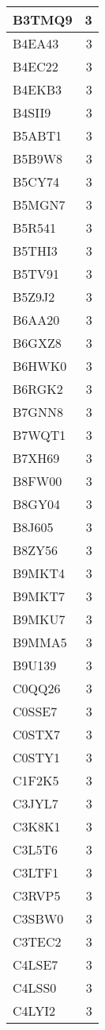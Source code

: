 \documentclass[
]{book}
\theoremstyle{definition}
\theoremstyle{definition}
\theoremstyle{definition}
\theoremstyle{definition}
\theoremstyle{remark}
\begin{document}
\begin{table}
\begin{tabular}{l|r}
\hline
B3TMQ9 & 3\\
\hline
B4EA43 & 3\\
\hline
B4EC22 & 3\\
\hline
B4EKB3 & 3\\
\hline
B4SII9 & 3\\
\hline
B5ABT1 & 3\\
\hline
B5B9W8 & 3\\
\hline
B5CY74 & 3\\
\hline
B5MGN7 & 3\\
\hline
B5R541 & 3\\
\hline
B5THI3 & 3\\
\hline
B5TV91 & 3\\
\hline
B5Z9J2 & 3\\
\hline
B6AA20 & 3\\
\hline
B6GXZ8 & 3\\
\hline
B6HWK0 & 3\\
\hline
B6RGK2 & 3\\
\hline
B7GNN8 & 3\\
\hline
B7WQT1 & 3\\
\hline
B7XH69 & 3\\
\hline
B8FW00 & 3\\
\hline
B8GY04 & 3\\
\hline
B8J605 & 3\\
\hline
B8ZY56 & 3\\
\hline
B9MKT4 & 3\\
\hline
B9MKT7 & 3\\
\hline
B9MKU7 & 3\\
\hline
B9MMA5 & 3\\
\hline
B9U139 & 3\\
\hline
C0QQ26 & 3\\
\hline
C0SSE7 & 3\\
\hline
C0STX7 & 3\\
\hline
C0STY1 & 3\\
\hline
C1F2K5 & 3\\
\hline
C3JYL7 & 3\\
\hline
C3K8K1 & 3\\
\hline
C3L5T6 & 3\\
\hline
C3LTF1 & 3\\
\hline
C3RVP5 & 3\\
\hline
C3SBW0 & 3\\
\hline
C3TEC2 & 3\\
\hline
C4LSE7 & 3\\
\hline
C4LSS0 & 3\\
\hline
C4LYI2 & 3\\

\end{tabular}
\end{table}
\end{document}

